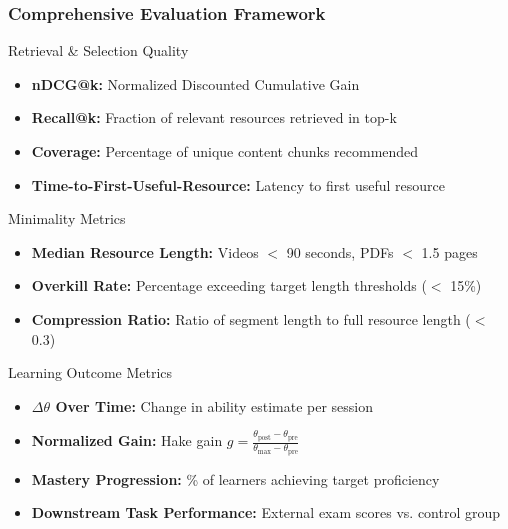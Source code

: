 \documentclass[aspectratio=169]{beamer}
\begin{document}
\begin{frame}
\frametitle{Comprehensive Evaluation Framework}
\begin{block}{Retrieval \& Selection Quality}
\begin{itemize}
\item \textbf{nDCG@k:} Normalized Discounted Cumulative Gain
\item \textbf{Recall@k:} Fraction of relevant resources retrieved in top-k
\item \textbf{Coverage:} Percentage of unique content chunks recommended
\item \textbf{Time-to-First-Useful-Resource:} Latency to first useful resource
\end{itemize}
\end{block}

\begin{block}{Minimality Metrics}
\begin{itemize}
\item \textbf{Median Resource Length:} Videos $<$ 90 seconds, PDFs $<$ 1.5 pages
\item \textbf{Overkill Rate:} Percentage exceeding target length thresholds ($<$ 15\%)
\item \textbf{Compression Ratio:} Ratio of segment length to full resource length ($<$ 0.3)
\end{itemize}
\end{block}

\begin{block}{Learning Outcome Metrics}
\begin{itemize}
\item \textbf{$\Delta\theta$ Over Time:} Change in ability estimate per session
\item \textbf{Normalized Gain:} Hake gain $g = \frac{\theta_{\text{post}} - \theta_{\text{pre}}}{\theta_{\text{max}} - \theta_{\text{pre}}}$
\item \textbf{Mastery Progression:} \% of learners achieving target proficiency
\item \textbf{Downstream Task Performance:} External exam scores vs. control group
\end{itemize}
\end{block}
\end{frame}
\end{document}
